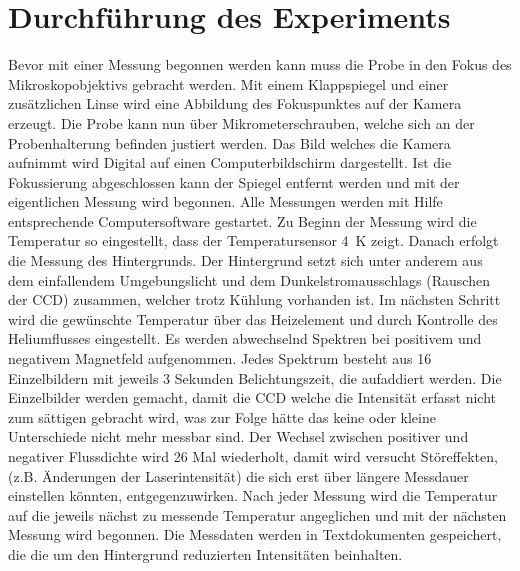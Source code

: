 \section{Durchführung des Experiments}
Bevor mit einer Messung begonnen werden kann muss die Probe in den Fokus des Mikroskopobjektivs 
gebracht werden. 
Mit einem Klappspiegel und einer zusätzlichen Linse wird eine Abbildung des 
Fokuspunktes auf der Kamera erzeugt. 
Die Probe kann nun über Mikrometerschrauben, welche sich an der 
Probenhalterung befinden justiert werden.
Das Bild welches die Kamera aufnimmt wird Digital auf einen Computerbildschirm dargestellt. 
Ist die Fokussierung abgeschlossen kann der Spiegel entfernt werden und mit der eigentlichen Messung 
wird begonnen.
Alle Messungen werden mit Hilfe entsprechende Computersoftware gestartet.
%
Zu Beginn der Messung wird die Temperatur so eingestellt, dass der Temperatursensor \SI{4}{\kelvin} zeigt. 
Danach erfolgt die Messung des Hintergrunds.
Der Hintergrund setzt sich unter anderem aus dem einfallendem Umgebungslicht und 
dem Dunkelstromausschlags (Rauschen der CCD) zusammen, welcher trotz Kühlung vorhanden ist.
Im nächsten Schritt wird die gewünschte Temperatur über das Heizelement und durch 
Kontrolle des Heliumflusses eingestellt. 
Es werden abwechselnd Spektren bei positivem und negativem Magnetfeld aufgenommen. 
Jedes Spektrum besteht aus 16 Einzelbildern mit jeweils 3 Sekunden Belichtungszeit, die aufaddiert werden.
Die Einzelbilder werden gemacht, damit die CCD welche die Intensität erfasst nicht zum sättigen 
gebracht wird, was zur Folge hätte das keine oder kleine Unterschiede nicht mehr messbar sind.
Der Wechsel zwischen positiver und negativer Flussdichte wird 26 Mal wiederholt, damit 
wird versucht Störeffekten, (z.B. Änderungen der Laserintensität) die sich erst über 
längere Messdauer einstellen könnten, entgegenzuwirken.
Nach jeder Messung wird die Temperatur auf die jeweils nächst zu messende Temperatur angeglichen
und mit der nächsten Messung wird begonnen.
Die Messdaten werden in Textdokumenten gespeichert, die die um den Hintergrund 
reduzierten Intensitäten beinhalten.